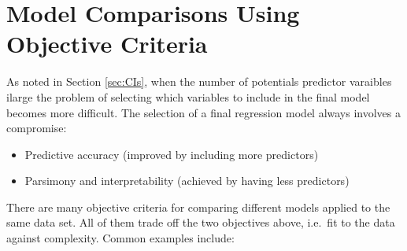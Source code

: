 \documentclass[]{article}
\providecommand{\tightlist}{%
  \setlength{\itemsep}{0pt}\setlength{\parskip}{0pt}}
\begin{document}
\newpage

\section{Model Comparisons Using Objective
Criteria}\label{sec:comparisons}

As noted in Section \ref{sec:CIs}, when the number of potentials
predictor varaibles ilarge the problem of selecting which variables to
include in the final model becomes more difficult. The selection of a
final regression model always involves a compromise:

\begin{itemize}
\tightlist
\item
  Predictive accuracy (improved by including more predictors)
\item
  Parsimony and interpretability (achieved by having less predictors)
\end{itemize}

There are many objective criteria for comparing different models applied
to the same data set. All of them trade off the two objectives above,
i.e.~fit to the data against complexity. Common examples include:
\end{document}
